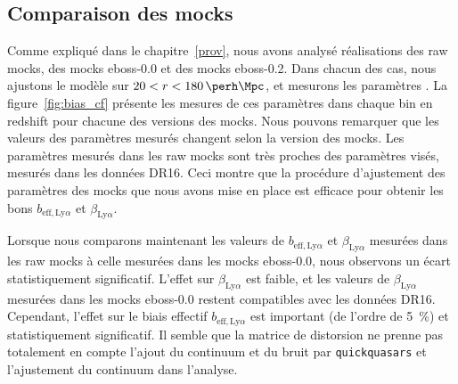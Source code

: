 \documentclass[11pt, twoside, a4paper, openright]{report}
\begin{document}
\subsection{Comparaison des mocks}
Comme expliqué dans le chapitre~\ref{prov}, nous avons analysé \Nmocks{} réalisations des raw mocks, des mocks eboss-0.0 et des mocks eboss-0.2.
Dans chacun des cas, nous ajustons le modèle sur $20 < r < \SI{180}{\perh\Mpc}$, et mesurons les paramètres \lya{}.
La figure~\ref{fig:bias_cf} présente les mesures de ces paramètres dans chaque bin en redshift pour chacune des versions des mocks.
Nous pouvons remarquer que les valeurs des paramètres \lya{} mesurés changent selon la version des mocks.
Les paramètres mesurés dans les raw mocks sont très proches des paramètres visés, mesurés dans les données DR16. Ceci montre que la procédure d'ajustement des paramètres des mocks que nous avons mise en place est efficace pour obtenir les bons $b_{\mathrm{eff},\mathrm{Ly}\alpha}$ et $\beta_{\mathrm{Ly}\alpha}$.

Lorsque nous comparons maintenant les valeurs de $b_{\mathrm{eff},\mathrm{Ly}\alpha}$ et $\beta_{\mathrm{Ly}\alpha}$ mesurées dans les raw mocks à celle mesurées dans les mocks eboss-0.0, nous observons un écart statistiquement significatif. L'effet sur $\beta_{\mathrm{Ly}\alpha}$ est faible, et les valeurs de $\beta_{\mathrm{Ly}\alpha}$ mesurées dans les mocks eboss-0.0 restent compatibles avec les données DR16.
Cependant, l'effet sur le biais effectif $b_{\mathrm{eff},\mathrm{Ly}\alpha}$ est important (de l'ordre de \SI{5}{\percent}) et statistiquement significatif.
Il semble que la matrice de distorsion ne prenne pas totalement en compte l'ajout du continuum et du bruit par \texttt{quickquasars} et l'ajustement du continuum dans l'analyse.
\end{document}
